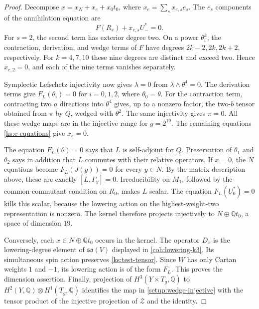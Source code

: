\documentclass[11pt]{article}
\numberwithin{equation}{section}
\theoremstyle{definition}
\theoremstyle{remark}
\begin{document}
\begin{proof}
Decompose
$x=x_N+x_e+x_0t_0$, where $x_e=\sum_sx_{e,s}e_s$.
The $e_s$ components of the annihilation equation are
\begin{equation}
 \label{ks:e-equations}
 F(R_s)+x_{e,s}U_-^*=0.
\end{equation}
For $s=2$, the second term has exterior degree two.  On a
power $\theta_i^k$, the contraction, derivation, and wedge
terms of $F$ have degrees $2k-2,2k,2k+2$, respectively.
For $k=4,7,10$ these nine degrees are distinct and exceed
two.  Hence $x_{e,2}=0$, and each of the nine terms vanishes
separately.

Symplectic Lefschetz injectivity now gives $\lambda=0$ from
$\lambda\wedge\theta^4=0$.  The derivation terms give
$F_L(\theta_i)=0$ for $i=0,1,2$, where $\theta_0=\theta$.
For the contraction term, contracting two $a$ directions into
$\theta^4$ gives, up to a nonzero factor, the two-$b$ tensor
obtained from $\pi$ by $Q$, wedged with $\theta^2$.
The same injectivity gives $\pi=0$.  All these wedge maps
are in the injective range for $g=2^{19}$.  The remaining
equations \eqref{ks:e-equations} give $x_e=0$.

The equation $F_L(\theta)=0$ says that $L$ is self-adjoint
for $Q$.  Preservation of $\theta_1$ and $\theta_2$ says
in addition that $L$ commutes with their relative operators.
If $x=0$, the $N$ equations become
$F_L(J(y))=0$ for every $y\in N$.  By the matrix description
above, these are exactly
$[L,\Gamma_y]=0$.  Irreducibility on $M_1$, followed by
the common-commutant condition on $R_0$, makes $L$ scalar.
The equation $F_L(U_0^*)=0$ kills this scalar, because
the lowering action on the highest-weight-two representation
is nonzero.  The kernel therefore projects injectively to
$N\oplus\mathbb Q t_0$, a space of dimension $19$.

Conversely, each $x\in N\oplus\mathbb Q t_0$ occurs in the kernel.
The operator $D_x$ is the lowering-degree element of
$\mathfrak{so}(V)$ displayed in \eqref{coh:lowering-k3}.
Its simultaneous spin action preserves \eqref{ks:test-tensor}.
Since $W$ has only Cartan weights $1$ and $-1$, its lowering
action is of the form $F_L$.  This proves the dimension
assertion.  Finally, projection of $H^3(Y\times T_g,\mathbb Q)$
to $H^2(Y,\mathbb Q)\otimes H^1(T_g,\mathbb Q)$ identifies the map in
\eqref{setup:wedge-injective} with the tensor product of
the injective projection of $\mathcal Z$ and the identity.
\end{proof}
\end{document}
